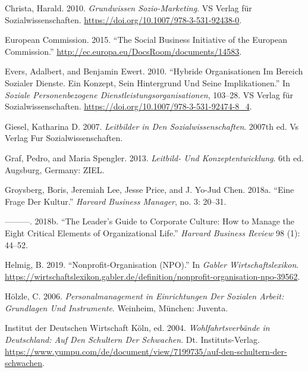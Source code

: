 \documentclass[
  letterpaper,
]{book}
\newlength{\cslhangindent}
\newenvironment{CSLReferences}[2] %
 {\begin{list}{}{%
  \setlength{\itemindent}{0pt}
  \setlength{\leftmargin}{0pt}
  \setlength{\parsep}{0pt}
  \ifodd #1
   \setlength{\leftmargin}{\cslhangindent}
   \setlength{\itemindent}{-1\cslhangindent}
  \fi
  \setlength{\itemsep}{#2\baselineskip}}}
 {\end{list}}
\begin{document}
\begin{CSLReferences}{1}{0}
Christa, Harald. 2010. \emph{Grundwissen Sozio-Marketing}. VS Verlag für
Sozialwissenschaften. \url{https://doi.org/10.1007/978-3-531-92438-0}.

European Commission. 2015. {``The Social Business Initiative of the
European Commission.''}
\url{http://ec.europa.eu/DocsRoom/documents/14583}.

Evers, Adalbert, and Benjamin Ewert. 2010. {``Hybride Organisationen Im
Bereich Sozialer Dienste. Ein Konzept, Sein Hintergrund Und Seine
Implikationen.''} In \emph{Soziale Personenbezogene
Dienstleistungsorganisationen}, 103--28. VS Verlag für
Sozialwissenschaften. \url{https://doi.org/10.1007/978-3-531-92474-8_4}.

Giesel, Katharina D. 2007. \emph{Leitbilder in Den
Sozialwissenschaften}. 2007th ed. Vs Verlag Fur Sozialwissenschaften.

Graf, Pedro, and Maria Spengler. 2013. \emph{Leitbild- Und
Konzeptentwicklung}. 6th ed. Augsburg, Germany: ZIEL.

Groysberg, Boris, Jeremiah Lee, Jesse Price, and J. Yo-Jud Chen. 2018a.
{``Eine Frage Der Kultur.''} \emph{Harvard Business Manager}, no. 3:
20--31.

---------. 2018b. {``The Leader's Guide to Corporate Culture: How to
Manage the Eight Critical Elements of Organizational Life.''}
\emph{Harvard Business Review} 98 (1): 44--52.

Helmig, B. 2019. {``Nonprofit-Organisation (NPO).''} In \emph{Gabler
Wirtschaftslexikon}.
\url{https://wirtschaftslexikon.gabler.de/definition/nonprofit-organisation-npo-39562}.

Hölzle, C. 2006. \emph{Personalmanagement in Einrichtungen Der Sozialen
Arbeit: Grundlagen Und Instrumente}. Weinheim, München: Juventa.

Institut der Deutschen Wirtschaft Köln, ed. 2004.
\emph{Wohlfahrtsverbände in Deutschland: Auf Den Schultern Der
Schwachen}. Dt. Instituts-Verlag.
\url{https://www.yumpu.com/de/document/view/7199735/auf-den-schultern-der-schwachen}.


\end{CSLReferences}
\end{document}
